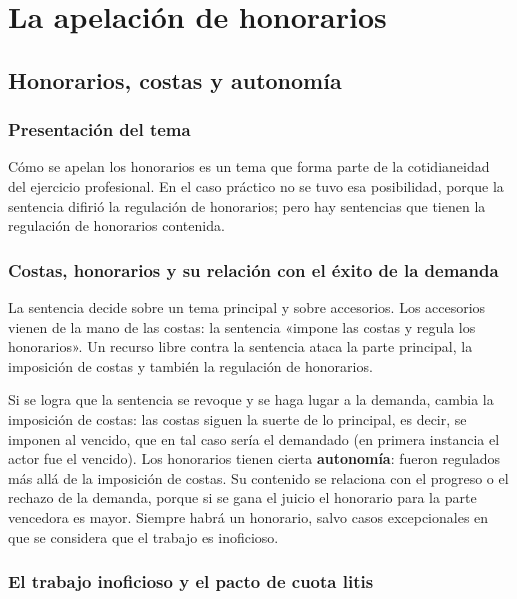 \documentclass[12pt,oneside]{book}
\begin{document}
\chapter[Apelación de honorarios]{La apelación de honorarios}

\section{Honorarios, costas y autonomía}

\subsection{Presentación del tema}

Cómo se apelan los honorarios es un tema que forma parte de la cotidianeidad del ejercicio profesional. En el caso práctico no se tuvo esa posibilidad, porque la sentencia difirió la regulación de honorarios; pero hay sentencias que tienen la regulación de honorarios contenida.

\subsection{Costas, honorarios y su relación con el éxito de la demanda}

La sentencia decide sobre un tema principal y sobre accesorios. Los accesorios vienen de la mano de las costas: la sentencia «impone las costas y regula los honorarios». Un recurso libre contra la sentencia ataca la parte principal, la imposición de costas y también la regulación de honorarios.

Si se logra que la sentencia se revoque y se haga lugar a la demanda, cambia la imposición de costas: las costas siguen la suerte de lo principal, es decir, se imponen al vencido, que en tal caso sería el demandado (en primera instancia el actor fue el vencido). Los honorarios tienen cierta \textbf{autonomía}: fueron regulados más allá de la imposición de costas. Su contenido se relaciona con el progreso o el rechazo de la demanda, porque si se gana el juicio el honorario para la parte vencedora es mayor. Siempre habrá un honorario, salvo casos excepcionales en que se considera que el trabajo es inoficioso.

\subsection{El trabajo inoficioso y el pacto de cuota litis}
\end{document}
